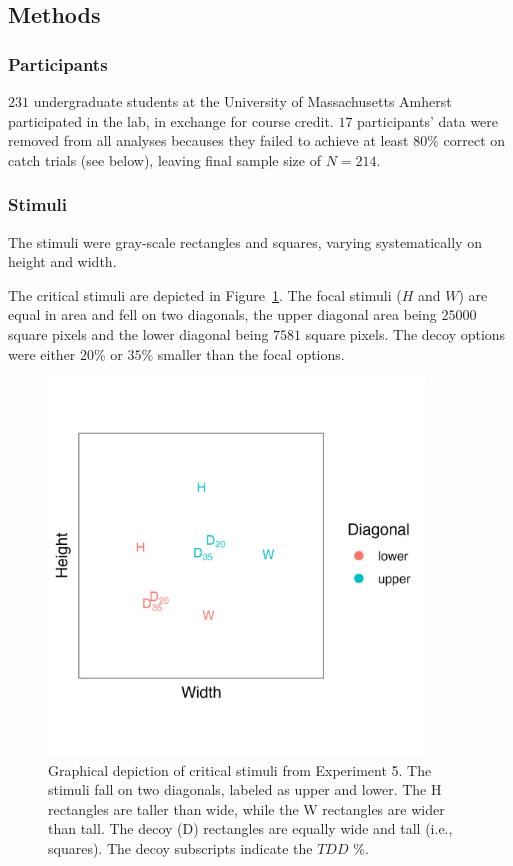 \subsection{Methods}

\subsubsection{Participants}
$231$ undergraduate students at the University of Massachusetts Amherst participated in the lab, in exchange for course credit. $17$ participants' data were removed from all analyses becauses they failed to achieve at least $80\%$ correct on catch trials (see below), leaving final sample size of $N=214$. 

\subsubsection{Stimuli}
The stimuli were gray-scale rectangles and squares, varying systematically on height and width. 

The critical stimuli are depicted in Figure~\ref{fig:comparability_stim_plot}. The focal stimuli ($H$ and $W$) are equal in area and fell on two diagonals, the upper diagonal area being $25000$ square pixels and the lower diagonal being $7581$ square pixels. The decoy options were either $20\%$ or $35\%$ smaller than the focal options.

\begin{figure}
   \includegraphics[width=100mm]{figures/comparability_stim.jpg}
   \caption{Graphical depiction of critical stimuli from Experiment 5. The stimuli fall on two diagonals, labeled as upper and lower. The H rectangles are taller than wide, while the W rectangles are wider than tall. The decoy (D) rectangles are equally wide and tall (i.e., squares). The decoy subscripts indicate the $TDD$ $\%$.}
   \label{fig:comparability_stim_plot}
\end{figure}


